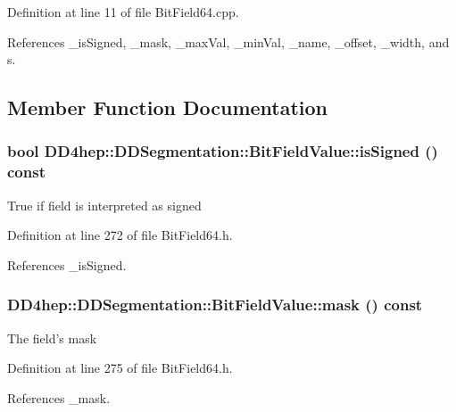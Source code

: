 Definition at line 11 of file BitField64.cpp.

References \_\-isSigned, \_\-mask, \_\-maxVal, \_\-minVal, \_\-name, \_\-offset, \_\-width, and s.

\subsection{Member Function Documentation}
\hypertarget{class_d_d4hep_1_1_d_d_segmentation_1_1_bit_field_value_a534995affb4726f721e8bc773fc249d3}{
\subsubsection[{isSigned}]{\setlength{\rightskip}{0pt plus 5cm}bool DD4hep::DDSegmentation::BitFieldValue::isSigned () const}}
\label{class_d_d4hep_1_1_d_d_segmentation_1_1_bit_field_value_a534995affb4726f721e8bc773fc249d3}
True if field is interpreted as signed 

Definition at line 272 of file BitField64.h.

References \_\-isSigned.\hypertarget{class_d_d4hep_1_1_d_d_segmentation_1_1_bit_field_value_af4b2ade5782da7a6a67ca5cbeae05e95}{
\subsubsection[{mask}]{ DD4hep::DDSegmentation::BitFieldValue::mask () const}}
\label{class_d_d4hep_1_1_d_d_segmentation_1_1_bit_field_value_af4b2ade5782da7a6a67ca5cbeae05e95}
The field's mask 

Definition at line 275 of file BitField64.h.

References \_\-mask.

